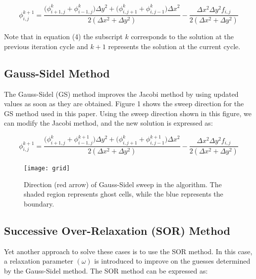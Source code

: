 \documentclass{article}
\begin{document}
\begin{equation}
\phi_{i,j}^{k+1} =  \frac{  \bigg(  \phi_{i+1,j}^{k}   + \phi_{i-1,j}^{k}  \bigg)\Delta y^{2} +  \bigg( \phi_{i,j+1}^{k}  + \phi_{i,j-1}^{k}  \bigg)\Delta x^{2}   }{ 2 ( \Delta x^{2} + \Delta y^{2} )} - \frac{\Delta x^{2} \Delta y^{2} f_{i,j}}{2 ( \Delta x^{2} + \Delta y^{2} )}
\end{equation}

\vspace{1em}

\noindent Note that in equation (4) the subscript $k$ corresponds to the solution at the previous iteration cycle and $k+1$ represents the solution at the current cycle. 

\subsection{Gauss-Sidel Method}

\noindent The Gauss-Sidel (GS) method improves the Jacobi method by using updated values as soon as they are obtained. Figure 1 shows the sweep direction for the GS method used in this paper. Using the sweep direction shown in this figure, we can modify the Jacobi method, and the new solution is expressed as:

\begin{equation}
\phi_{i,j}^{k+1} =  \frac{  \bigg(  \phi_{i+1,j}^{k}   + \phi_{i-1,j}^{k+1}  \bigg)\Delta y^{2} +  \bigg( \phi_{i,j+1}^{k}  + \phi_{i,j-1}^{k+1}  \bigg)\Delta x^{2}   }{ 2 ( \Delta x^{2} + \Delta y^{2} )} - \frac{\Delta x^{2} \Delta y^{2} f_{i,j}}{2 ( \Delta x^{2} + \Delta y^{2} )}
\end{equation}


\begin{figure}[H]
\centering
\texttt{[image: grid]}\label{Grid}
\caption{Direction (red arrow) of Gauss-Sidel sweep in the algorithm. The shaded region represents ghost cells, while the blue represents the boundary. }
\end{figure}

\newpage


\subsection{Successive Over-Relaxation (SOR) Method}

Yet another approach to solve these cases is to use the SOR method. In this case, a relaxation parameter $ ( \omega )$ is introduced to improve on the guesses determined by the Gauss-Sidel method. The SOR method can be expressed as:
\end{document}

